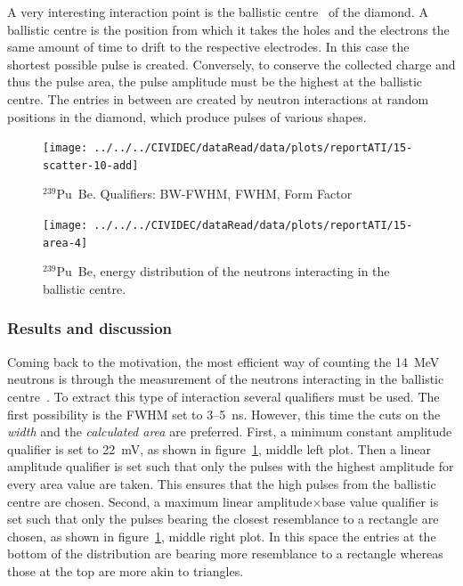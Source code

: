 A very interesting interaction point is the ballistic centre~\cite{PAVEL:00001, CHRISSI:00005} of the diamond. A ballistic centre is the position from which it takes the holes and the electrons the same amount of time to drift to the respective electrodes. In this case the shortest possible pulse is created. Conversely, to conserve the collected charge and thus the pulse area, the pulse amplitude must be the highest at the ballistic centre. The entries in between are created by neutron interactions at random positions in the diamond, which produce pulses of various shapes. 


\clearpage
\begin{figure}[]
\centering
\texttt{[image: ../../../CIVIDEC/dataRead/data/plots/reportATI/15-scatter-10-add]}
\caption{$^{239}$Pu~Be. Qualifiers: BW-FWHM, FWHM, Form Factor}
\label{fig:scatterpu}
\end{figure}

\clearpage
\begin{figure}[!t]
\centering
\texttt{[image: ../../../CIVIDEC/dataRead/data/plots/reportATI/15-area-4]}
\caption{$^{239}$Pu~Be, energy distribution of the neutrons interacting in the ballistic centre.}
\label{fig:scatterpuarea}
\end{figure}

\subsubsection{Results and discussion}
Coming back to the motivation, the most efficient way of counting the 14~MeV neutrons is through the measurement of the neutrons interacting in the ballistic centre~\cite{PAVEL:00001, CHRISSI:00005}. To extract this type of interaction several qualifiers must be used. The first possibility is the FWHM set to 3--5~ns. However, this time the cuts on the \emph{width} and the \emph{calculated area} are preferred. First, a minimum constant amplitude qualifier is set to 22~mV, as shown in figure~\ref{fig:scatterpu}, middle left plot. Then a linear amplitude qualifier is set such that only the pulses with the highest amplitude for every area value are taken. This ensures that the high pulses from the ballistic centre are chosen. Second, a maximum linear amplitude$\times$base value qualifier is set such that only the pulses bearing the closest resemblance to a rectangle are chosen, as shown in figure~\ref{fig:scatterpu}, middle right plot. In this space the entries at the bottom of the distribution are bearing more resemblance to a rectangle whereas those at the top are more akin to triangles.


